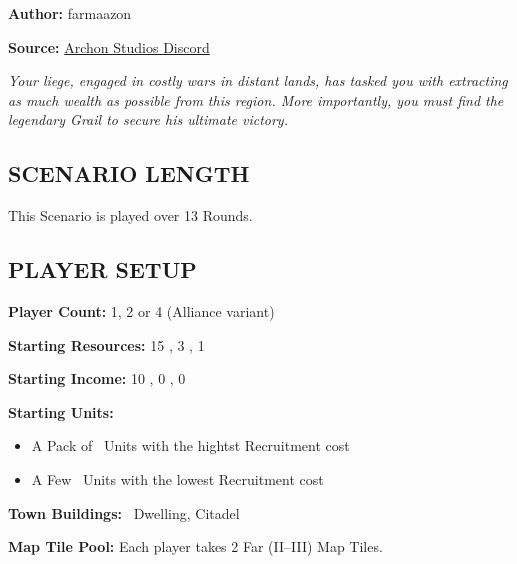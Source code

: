 
\newenvironment{Figure}
{\par\medskip\noindent\minipage{\linewidth}}
{\endminipage\par\medskip}

\begin{multicols*}{2}

\textbf{Author:} farmaazon

\textbf{Source:} \href{https://discordapp.com/channels/740870068178649108/1344400556717768865/1344400556717768865}{Archon Studios Discord}

\textit{Your liege, engaged in costly wars in distant lands, has tasked you with extracting as much wealth as possible from this region. More importantly, you must find the legendary Grail to secure his ultimate victory.}

\subsection*{\MakeUppercase{Scenario Length}}

This Scenario is played over 13 Rounds.

\subsection*{\MakeUppercase{Player Setup}}

\textbf{Player Count:} 1, 2 or 4 (Alliance variant)

\textbf{Starting Resources:} 15 , 3 , 1 

\textbf{Starting Income:} 10 , 0 , 0 

\textbf{Starting Units:}
\begin{itemize}
  \item A Pack of \bronze\ Units with the hightst Recruitment cost
  \item A Few \silver\ Units with the lowest Recruitment cost
\end{itemize}

\textbf{Town Buildings:} \bronze\ Dwelling, Citadel

\textbf{Map Tile Pool:} Each player takes 2 Far (II--III) Map Tiles.

\vspace{9em}


\end{multicols*}

